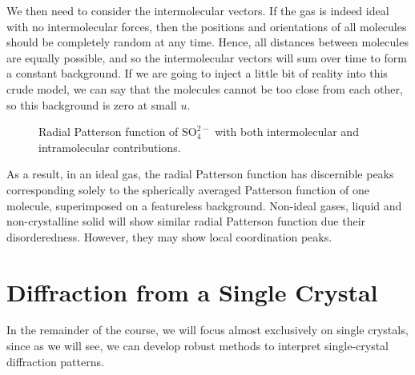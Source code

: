 \documentclass{article}
\theoremstyle{plain}\theoremheaderfont{\normalfont\itshape}\theorembodyfont{\rmfamily}\theoremseparator{.}\newtheorem*{rem}{Remark}\newtheorem*{ex}{Example}\newtheorem*{proof}{Proof}\newtheorem*{altp}{Alternative proof}
\theoremstyle{plain}\theoremheaderfont{\normalfont\bfseries}\theorembodyfont{\rmfamily}\theoremseparator{.}\newtheorem{thm}{Theorem}[section]\newtheorem{lem}[thm]{Lemma}\newtheorem{prop}[thm]{Proposition}\newtheorem*{cor}{Corollary}\newtheorem{defn}[thm]{Definition}\newtheorem{clm}[thm]{Claim}\newtheorem{clminproof}{Claim}\newtheorem*{law}{Law}\newtheorem{pos}[thm]{Postulate}
\theoremstyle{break}\theoremheaderfont{\normalfont\itshape}\theorembodyfont{\rmfamily}\theoremseparator{.\medskip}\newtheorem*{proofskip}{Proof}\newtheorem*{exs}{Examples}\newtheorem*{rems}{Remarks}
\theoremstyle{break}\theoremheaderfont{\normalfont\bfseries}\theorembodyfont{\rmfamily}\theoremseparator{.\medskip}\newtheorem{lemskip}[thm]{Lemma}\newtheorem{defnskip}[thm]{Definition}\newtheorem{propskip}[thm]{Proposition}\newtheorem{thmskip}[thm]{Theorem}
\numberwithin{equation}{section}
\begin{document}
    We then need to consider the intermolecular vectors. If the gas is indeed ideal with no intermolecular forces, then the positions and orientations of all molecules should be completely random at any time. Hence, all distances between molecules are equally possible, and so the intermolecular vectors will sum over time to form a constant background. If we are going to inject a little bit of reality into this crude model, we can say that the molecules cannot be too close from each other, so this background is zero at small \(u\).

    \begin{figure}[ht!]
        \centering
        \caption{Radial Patterson function of \(\mathrm{SO_4^{2-}}\) with both intermolecular and intramolecular contributions.}
    \end{figure}

    As a result, in an ideal gas, the radial Patterson function has discernible peaks corresponding solely to the spherically averaged Patterson function of one molecule, superimposed on a featureless background. Non-ideal gases, liquid and non-crystalline solid will show similar radial Patterson function due their disorderedness. However, they may show local coordination peaks.

    \newpage
    \section{Diffraction from a Single Crystal}
    In the remainder of the course, we will focus almost exclusively on single crystals, since as we will see, we can develop robust methods to interpret single-crystal diffraction patterns.
\end{document}

